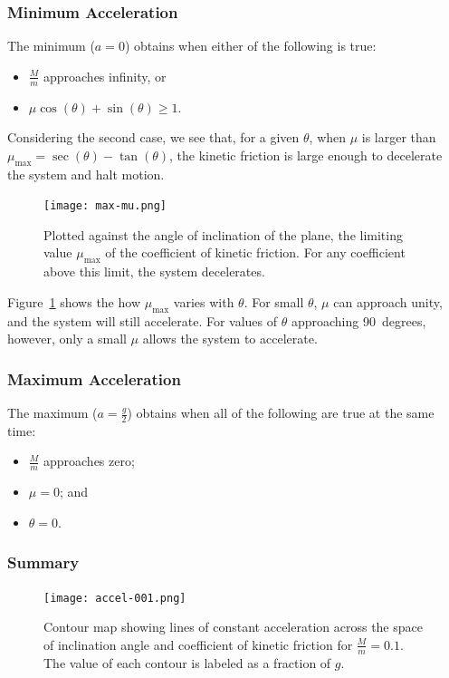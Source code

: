 \documentclass[twocolumn]{article}
\begin{document}
\subsubsection{Minimum Acceleration}

The minimum ($a = 0$) obtains when either of the following is true:
\begin{itemize}
   \item $\tfrac{M}{m}$ approaches infinity, or
   \item $\mu \cos(\theta) + \sin(\theta) \geq 1$.
\end{itemize}
Considering the second case, we see that, for a given $\theta$, when $\mu$ is
larger than $\mu_\text{max} = \sec(\theta) - \tan(\theta)$, the kinetic
friction is large enough to decelerate the system and halt motion.
\begin{figure}
   \texttt{[image: max-mu.png]}
   \caption{Plotted against the angle of inclination of the plane, the limiting
   value $\mu_\text{max}$ of the coefficient of kinetic friction. For any
   coefficient above this limit, the system decelerates.}
   \label{fig:mu-max}
\end{figure}
Figure~\ref{fig:mu-max} shows the how $\mu_\text{max}$ varies with $\theta$.
For small $\theta$, $\mu$ can approach unity, and the system will still
accelerate. For values of $\theta$ approaching 90~degrees, however, only a
small $\mu$ allows the system to accelerate.

\subsubsection{Maximum Acceleration}

The maximum ($a = \tfrac{g}{2}$) obtains when all of the following are true at
the same time:
\begin{itemize}
   \item $\tfrac{M}{m}$ approaches zero;
   \item $\mu = 0$; and
   \item $\theta = 0$.
\end{itemize}

\subsubsection{Summary}

\begin{figure}
   \texttt{[image: accel-001.png]}
   \caption{Contour map showing lines of constant acceleration across the space
   of inclination angle and coefficient of kinetic friction for $\tfrac{M}{m} =
   0.1$. The value of each contour is labeled as a fraction of $g$.}
   \label{fig:accel-001}
\end{figure}
\end{document}
